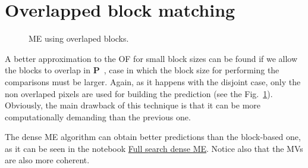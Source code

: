 \section{Overlapped block matching}


\begin{figure}
  \centering
  \caption{ME using overlaped blocks.}
  \label{fig:overlaped}
\end{figure}

A better approximation to the OF for small block sizes can be found if
we allow the blocks to overlap in ${\mathbf
  P}$~\cite{orchard1994overlapped}, case in which the block size for
performing the comparisons must be larger. Again, as it happens with
the disjoint case, only the non overlaped pixels are used for building
the prediction (see the Fig.~\ref{fig:overlaped}). Obviously, the main
drawback of this technique is that it can be more computationally
demanding than the previous one.

\begin{comment}
\begin{figure}
  \centering
  \png{stockholm_hat_P_dense}{800}
  \caption{The prediction frame (${\hat{\mathbf P}}$). See \href{https://github.com/Sistemas-Multimedia/Sistemas-Multimedia.github.io/blob/master/milestones/09-ME/full_search_dense_ME.ipynb}{this}.}
  \label{fig:hat_P_dense}
\end{figure}

\begin{figure}
  \centering
  \png{stockholm_error_dense}{800}
  \caption{The prediction error frame (${\mathbf R} - {\hat{\mathbf P}}$). See \href{https://github.com/Sistemas-Multimedia/Sistemas-Multimedia.github.io/blob/master/milestones/09-ME/full_search_dense_ME.ipynb}{this}.}
  \label{fig:error_dense}
\end{figure}

\begin{figure}
  \centering
  \png{stockholm_MVs_dense}{800}
  \caption{Motion vectors to map ${\mathbf P}$ (from which each pixel has been mapped) onto ${\mathbf R}$. See \href{https://github.com/Sistemas-Multimedia/Sistemas-Multimedia.github.io/blob/master/milestones/09-ME/full_search_dense_ME.ipynb}{this}.}
  \label{fig:MVs_dense}
\end{figure}
\end{comment}

The dense ME algorithm can obtain better predictions than the
block-based one, as it can be seen in the notebook
\href{https://github.com/vicente-gonzalez-ruiz/motion_estimation/blob/main/src/motion_estimation/full_search_dense_ME.ipynb}{Full
  search dense ME}. Notice also that the MVs are also more coherent.

